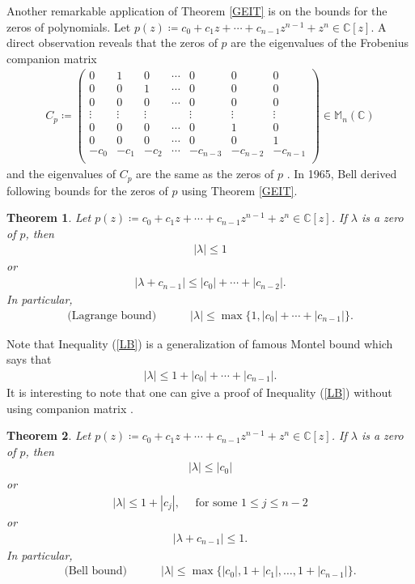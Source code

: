 \documentclass{amsart}
\newtheorem{theorem}{Theorem}[section]
\begin{document}
Another  remarkable application of Theorem \ref{GEIT} is on the bounds for the zeros of polynomials. Let $p(z)\coloneqq c_0+c_1z+\cdots +c_{n-1}z^{n-1}+z^n \in \mathbb{C}[z]$. A direct observation reveals that the zeros of $p$ are the eigenvalues of the Frobenius companion matrix 
\begin{align*}
	C_p\coloneqq 
	\begin{pmatrix}
		0&1&0&\cdots &0 &0&0\\
		0&0&1&\cdots &0 &0&0\\
		0&0&0&\cdots &0 &0&0\\
		\vdots &\vdots &\vdots & & \vdots &\vdots &\vdots\\
		0&0&0&\cdots &0 &1&0\\
		0&0&0&\cdots &0 &0&1\\
	-c_0&-c_1&-c_2&\cdots &-c_{n-3} &-c_{n-2}&-c_{n-1}\\
	\end{pmatrix} \in \mathbb{M}_n(\mathbb{C})
\end{align*}
and the eigenvalues of $C_p$ are the same as the zeros of $p$ \cite{BRAND, BRAND2}. In 1965, Bell derived following bounds for the zeros of $p$ using Theorem \ref{GEIT}.
\begin{theorem} \cite{BELL}
Let $p(z)\coloneqq c_0+c_1z+\cdots +c_{n-1}z^{n-1}+z^n \in \mathbb{C}[z]$.  If $\lambda$ is a  zero of $p$, then 
\begin{align*}
	|\lambda|\leq 1
\end{align*}
or 
\begin{align*}
	|\lambda+c_{n-1}|\leq |c_0|+\cdots +|c_{n-2}|.
\end{align*}
In particular, 
\begin{align}\label{LB}
\text{(Lagrange bound)} \quad \quad \quad 	|\lambda|\leq \max\{1, |c_0|+\cdots+|c_{n-1}|\}.
\end{align}
\end{theorem}
Note that Inequality (\ref{LB}) is a generalization of famous Montel bound \cite{HORNJOHNSON} which says that 
\begin{align*}
	|\lambda|\leq 1+|c_0|+\cdots+|c_{n-1}|.
\end{align*}
It is interesting to note that one can give a proof of Inequality (\ref{LB}) without using companion matrix \cite{HIRSTMACEY}.
\begin{theorem} \cite{BELL}
	Let $p(z)\coloneqq c_0+c_1z+\cdots +c_{n-1}z^{n-1}+z^n \in \mathbb{C}[z]$.  If $\lambda$ is a  zero of $p$, then 
	\begin{align*}
		|\lambda|\leq |c_0|
	\end{align*}
	or 
		\begin{align*}
		|\lambda|\leq 1+|c_{j}|, \quad \text{ for some } 1\leq j \leq n-2
	\end{align*}
	or 
	\begin{align*}
		|\lambda+c_{n-1}|\leq 1.
	\end{align*}
	In particular, 
	\begin{align}\label{BB}
	\text{(Bell bound)} \quad \quad \quad	|\lambda|\leq \max\{|c_0|, 1+|c_1|, \dots, 1+|c_{n-1}|\}.
	\end{align}
\end{theorem}
\end{document}
